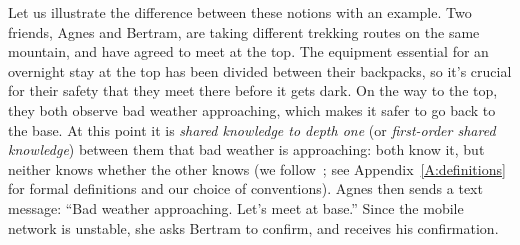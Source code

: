 Let us illustrate the difference between these notions with an example. Two friends, Agnes and Bertram, are taking different trekking routes on the same mountain, and have agreed to meet at the top. The equipment essential for an overnight stay at the top has been divided between their backpacks, so it's crucial for their safety that they meet there before it gets dark. On the way to the top, they both observe bad weather approaching, which makes it safer to go back to the base. At this point it is \emph{shared knowledge to depth one} (or \emph{first-order shared knowledge}) between them that bad weather is approaching: both know it, but neither knows whether the other knows (we follow~\cite{clark1981definite,herzig2015share}; see Appendix~\ref{A:definitions} for formal definitions and our choice of conventions). Agnes then sends a text message: ``Bad weather approaching. Let's meet at base.'' Since the mobile network is unstable, she asks Bertram to confirm, and receives his confirmation.
